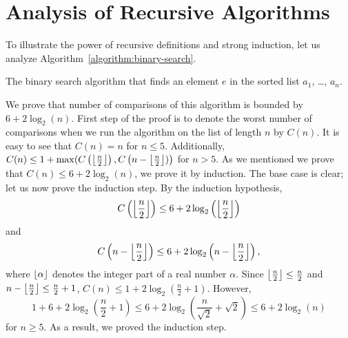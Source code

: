 \section{Analysis of Recursive Algorithms}
To illustrate the power of recursive definitions and strong induction, let us
analyze Algorithm~\ref{algorithm:binary-search}.
\begin{algorithm}
    \begin{algorithmic}[1]
                        \State{}
                    \EndIf
                \EndFor
            \Else
                    \State{}
                \Else
                    \State{}
                \EndIf
            \EndIf
        \EndFunction
    \end{algorithmic}
    \caption{The binary search algorithm that finds an element $e$ in the sorted
        list $a_1$, \dots, $a_n$.}
    \label{algorithm:binary-search}
\end{algorithm}
We prove that number of comparisons of this algorithm is bounded by
$6 + 2\log_2(n)$. First step of the proof is to denote the worst
number of comparisons when we run the algorithm on the list of length $n$ by
$C(n)$. It is easy to see that $C(n) = n$ for $n \le 5$. Additionally,
$C(n) \le 1 +
    \max(C\left(\left\lfloor {\frac{n}{2}} \right\rfloor\right),
         C\left(n - \left\lfloor {\frac{n}{2}} \right\rfloor)\right)$
for $n > 5$. As we mentioned we prove that $C(n) \le 6 + 2\log_2(n)$, we prove
it by induction. The base case is clear; let us now prove the induction step.
By the induction hypothesis,
\[
    C\left(\left\lfloor {\frac{n}{2}} \right\rfloor\right) \le
        6 + 2\log_2\left(\left\lfloor {\frac{n}{2}} \right\rfloor\right)
\]
and
\[
    C\left(n - \left\lfloor {\frac{n}{2}} \right\rfloor\right) \le
        6 + 2\log_2\left(n - \left\lfloor {\frac{n}{2}} \right\rfloor\right),
\]
where $\left\lfloor {\alpha} \right\rfloor$ denotes the integer part of a real number $\alpha$.
Since $\left\lfloor {\frac{n}{2}} \right\rfloor \le \frac{n}{2}$ and $n - \left\lfloor {\frac{n}{2}} \right\rfloor \le
\frac{n}{2} + 1$, $C(n) \le 1 + 2\log_2(\frac{n}{2} + 1)$.
However,
\[
    1 + 6 + 2\log_2\left(\frac{n}{2} + 1\right) \le
    6 + 2\log_2\left(\frac{n}{\sqrt{2}} + \sqrt{2}\right) \le 6 + 2 \log_2(n)
\]
for $n \ge 5$. As a result, we proved the induction step.


